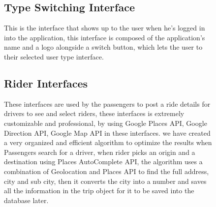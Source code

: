 \begin{figure}
\subsection{Type Switching Interface}
This is the interface that shows up to the user when he’s logged in into the application, this interface is composed of the application’s name and a logo alongside a switch button, which lets the user to their selected user type interface.
\begin{center}
\end{center}
\subsection{Rider Interfaces}
These interfaces are used by the passengers to post a ride details for drivers to see and select riders, these interfaces is extremely customizable and professional, by using Google Places API, Google Direction API, Google Map API in these interfaces. we have created a very organized and efficient algorithm to optimize the results when Passengers search for a driver, when rider picks an origin and a destination using Places AutoComplete API, the algorithm uses a combination of Geolocation and Places API to find the full address, city and sub city, then it converts the city into a number and saves all the information in the trip object for it to be saved into the database later.
\end{figure}

\begin{figure} 
\hspace*{\fill}
\hfill 
{}
\hspace*{\fill}
\end{figure}

\begin{figure}
\hspace*{\fill}
\hfill 
{}
\hspace*{\fill}
\end{figure}

